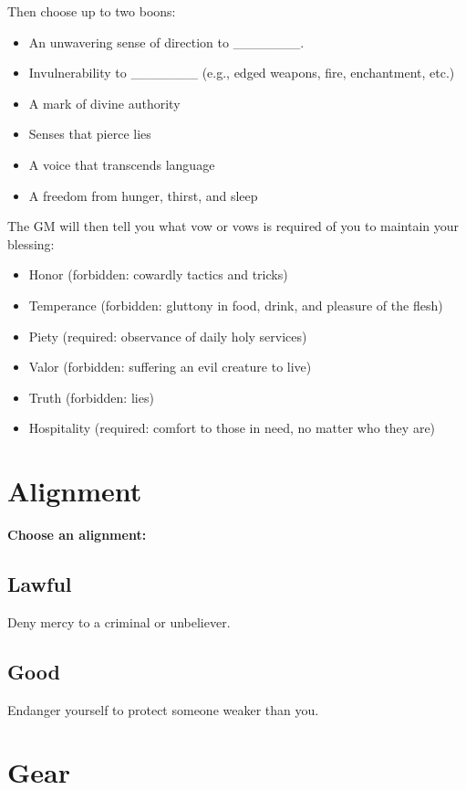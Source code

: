 Then choose up to two boons:
\begin{itemize}
\item An unwavering sense of direction to \_\_\_\_\_\_\_.
\item Invulnerability to \_\_\_\_\_\_\_ (e.g., edged weapons, fire, enchantment, etc.)
\item A mark of divine authority
\item Senses that pierce lies
\item A voice that transcends language
\item A freedom from hunger, thirst, and sleep

\end{itemize}

The GM will then tell you what vow or vows is required of you to maintain your blessing:
\begin{itemize}
\item Honor (forbidden: cowardly tactics and tricks)
\item Temperance (forbidden: gluttony in food, drink, and pleasure of the flesh)
\item Piety (required: observance of daily holy services)
\item Valor (forbidden: suffering an evil creature to live)
\item Truth (forbidden: lies)
\item Hospitality (required: comfort to those in need, no matter who they are)

\end{itemize}
\section*{Alignment}

{\bfseries Choose an alignment:}
\subsection{Lawful}

Deny mercy to a criminal or unbeliever.
\subsection{Good}

Endanger yourself to protect someone weaker than you.
\section*{Gear}

